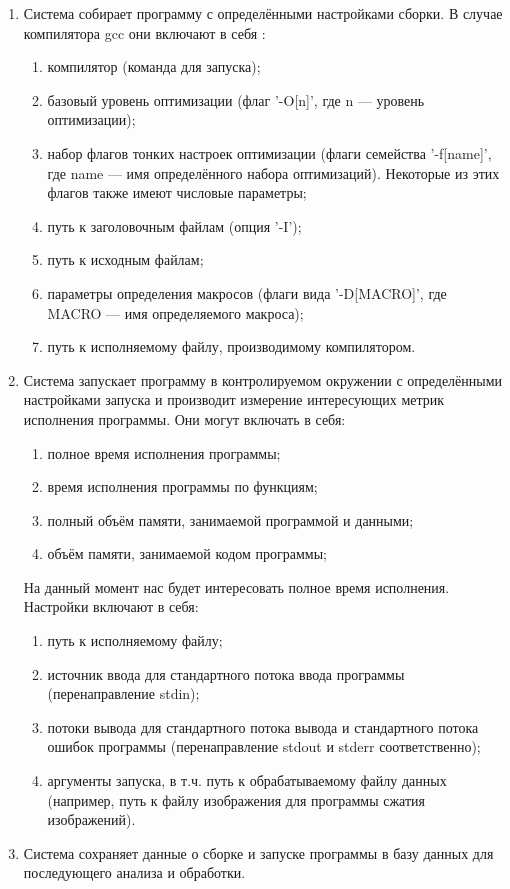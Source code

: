 \begin{enumerate}
	\item Система собирает программу с определёнными настройками сборки. В случае компилятора gcc они включают в себя \cite{gcc-options}:

	\begin{enumerate}
		\item компилятор (команда для запуска);
		\item базовый уровень оптимизации (флаг '-O[n]', где n --- уровень оптимизации);
		\item набор флагов тонких настроек оптимизации (флаги семейства '-f[name]', где name --- имя определённого набора оптимизаций). Некоторые из этих флагов также имеют числовые параметры;
		\item путь к заголовочным файлам (опция '-I');
		\item путь к исходным файлам;
		\item параметры определения макросов (флаги вида '-D[MACRO]', где MACRO --- имя определяемого макроса);
		\item путь к исполняемому файлу, производимому компилятором.
	\end{enumerate}

	\item Система запускает программу в контролируемом окружении с определёнными настройками запуска и производит измерение интересующих метрик исполнения программы. Они могут включать в себя:

	\begin{enumerate}
		\item полное время исполнения программы;
		\item время исполнения программы по функциям;
		\item полный объём памяти, занимаемой программой и данными;
		\item объём памяти, занимаемой кодом программы;
	\end{enumerate}

	На данный момент нас будет интересовать полное время исполнения.
	Настройки включают в себя:

	\begin{enumerate}
		\item путь к исполняемому файлу;
		\item источник ввода для стандартного потока ввода программы (перенаправление stdin);
		\item потоки вывода для стандартного потока вывода и стандартного потока ошибок программы (перенаправление stdout и stderr соответственно);
		\item аргументы запуска, в т.ч. путь к обрабатываемому файлу данных (например, путь к файлу изображения для программы сжатия изображений).

	\end{enumerate}

	\item Система сохраняет данные о сборке и запуске программы в базу данных для последующего анализа и обработки.
\end{enumerate}


